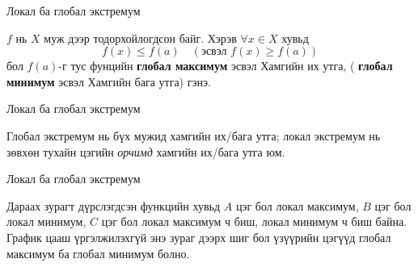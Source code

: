 \begin{frame}[allowframebreaks]{Локал ба глобал экстремум}
\begin{definition}
$f$ нь $X$ муж дээр тодорхойлогдсон байг. Хэрэв $\forall x\in X$ хувьд 
\[
f(x)\le f(a)\quad(\text{эсвэл } f(x)\ge f(a))
\]
бол $f(a)$-г  тус фунцийн \textbf{глобал максимум} эсвэл Хамгийн их утга, ( \textbf{глобал минимум} эсвэл Хамгийн бага утга) гэнэ.
\end{definition}
\end{frame}

\begin{frame}[allowframebreaks]{Локал ба глобал экстремум}
\begin{remark}
Глобал экстремум нь бүх мужид хамгийн их/бага утга; локал экстремум нь зөвхөн тухайн цэгийн \emph{орчимд} хамгийн их/бага утга юм.
\end{remark}
\end{frame}

\begin{frame}[allowframebreaks]{Локал ба глобал экстремум}
\begin{example}
Дараах зурагт дүрслэгдсэн функцийн хувьд $A$ цэг бол локал максимум, $B$ цэг бол локал минимум, $C$ цэг бол локал максимум ч биш, локал минимум ч биш байна. График цааш үргэлжилэхгүй энэ зураг дээрх шиг бол үзүүрийн цэгүүд глобал максимум ба глобал минимум болно. 
\begin{center}
\begin{fitbox}\end{fitbox}
\end{center}
\end{example}
\end{frame}


